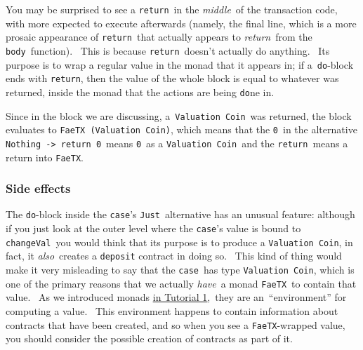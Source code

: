\documentclass[11pt]{article}
\DeclareRobustCommand{\fuline}[1]{\texorpdfstring{\uline{#1}}{#1}}
\begin{document}
\vspace{11pt}

You may be surprised to see a \texttt{return} in the \textit{middle} of the transaction code, with more expected to execute afterwards (namely, the final line, which is a more prosaic appearance of \texttt{return} that actually appears to \textit{return} from the \texttt{body} function).  This is because \texttt{return} doesn't actually do anything.  Its purpose is to wrap a regular value in the monad that it appears in; if a \texttt{do}-block ends with \texttt{return}, then the value of the whole block is equal to whatever was returned, inside the monad that the actions are being \texttt{do}ne in.  


\vspace{11pt}

Since in the block we are discussing, a \texttt{Valuation Coin} was returned, the block evaluates to \texttt{FaeTX (Valuation Coin)}, which means that the \texttt{0} in the alternative \texttt{Nothing -}\texttt{\textgreater{}}\texttt{ return 0} means \texttt{0} as a \texttt{Valuation Coin} and the \texttt{return} means a return into \texttt{FaeTX}.

\subsubsection{Side effects}
\vspace{5.5pt}

The \texttt{do}-block inside the \texttt{case}'s \texttt{Just} alternative has an unusual feature: although if you just look at the outer level where the \texttt{case}'s value is bound to \texttt{changeVal} you would think that its purpose is to produce a \texttt{Valuation Coin}, in fact, it \textit{also} creates a \texttt{deposit}\textit{ }contract in doing so.  This kind of thing would make it very misleading to say that the \texttt{case} has type \texttt{Valuation Coin}, which is one of the primary reasons that we actually \textit{have} a monad \texttt{FaeTX} to contain that value.  As we introduced monads \href{https://consensys.quip.com/IHP2AzL922EJ/Tutorial-1-Transactions-and-contracts\%23PfaACA1MylR}{\fuline{in Tutorial 1}}, they are an “environment” for computing a value.  This environment happens to contain information about contracts that have been created, and so when you see a \texttt{FaeTX}-wrapped value, you should consider the possible creation of contracts as part of it.
\end{document}
